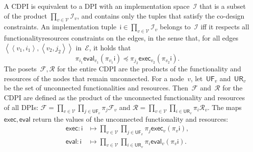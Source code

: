 \documentclass[twocolumn,english]{IEEEtran}
\theoremstyle{definition}
\theoremstyle{plain}
\theoremstyle{definition}
\theoremstyle{remark}
\theoremstyle{definition}
\theoremstyle{plain}
\theoremstyle{plain}
\newcommand{\aword}[1]{\mathsf{#1}}
\newcommand{\vmath}[1]{\aword{#1}}
\newcommand{\posleq}{\preceq}
\newcommand{\funsp}{\mathscr{F}}
\newcommand{\imp}{\vmath{i}}
\newcommand{\impsp}{\mathscr{I}}
\newcommand{\exc}{\vmath{exec}}
\newcommand{\eval}{\vmath{eval}}
\newcommand{\ressp}{\mathscr{R}}
\newcommand{\unconnectedfun}{\mathsf{UF}}
\newcommand{\unconnectedres}{\mathsf{UR}}
\newcommand{\cdpiN}{\mathcal{V}}
\newcommand{\cdpin}{v}
\newcommand{\cdpinA}{v_1}
\newcommand{\cdpinB}{v_2}
\newcommand{\cdpiresind}{i}
\newcommand{\cdpifunind}{j}
\newcommand{\cdpiresindA}{i_1}
\newcommand{\cdpifunindB}{j_2}
\begin{document}
A CDPI is equivalent to a DPI with an implementation space~$\impsp$
that is a subset of the product $\prod_{\cdpin\in\cdpiN}\impsp_{\cdpin}$,
and contains only the tuples that satisfy the co-design constraints.
An implementation tuple~$\imp\in\prod_{\cdpin\in\cdpiN}\impsp_{\cdpin}$
belongs to~$\impsp$ iff it respects all functionality\textendash resources
constraints on the edges, in the sense that, for all edges~$\left\langle \left\langle \cdpinA,\cdpiresindA\right\rangle ,\left\langle \cdpinB,\cdpifunindB\right\rangle \right\rangle $
in~$\mathcal{E}$, it holds that 
\[
\pi_{\cdpiresindA}\eval_{\cdpinA}(\pi_{\cdpinA}\imp)\posleq\pi_{\cdpifunindB}\exc_{\cdpinB}(\pi_{\cdpinB}\imp).
\]
The posets~$\funsp,\ressp$ for the entire CDPI are the products
of the functionality and resources of the nodes that remain unconnected.
For a node~$\cdpin$, let~$\unconnectedfun_{\cdpin}$ and~$\unconnectedres_{\cdpin}$
be the set of unconnected functionalities and resources. Then~$\funsp$
and~$\ressp$ for the CDPI are defined as the product of the unconnected
functionality and resources of all DPIs: $\funsp=\prod_{\cdpin\in\cdpiN}\prod_{\cdpifunind\in\unconnectedfun_{\cdpin}}\pi_{\cdpifunind}\funsp_{\cdpin}$
and $\ressp=\prod_{\cdpin\in\cdpiN}\prod_{\cdpiresind\in\unconnectedres_{\cdpin}}\pi_{\cdpiresind}\ressp_{\cdpin}.$
The maps $\exc,\eval$ return the values of the unconnected functionality
and resources:
\begin{align*}
\exc:\imp & \mapsto{\scriptstyle {\displaystyle \prod_{\cdpin\in\cdpiN}\prod_{\cdpifunind\in\unconnectedfun_{\cdpin}}}}\pi_{\cdpifunind}\exc_{\cdpin}(\pi_{\cdpin}\imp),\\
\eval:\imp & \mapsto{\displaystyle \prod_{\cdpin\in\cdpiN}\prod_{\cdpiresind\in\unconnectedres_{\cdpin}}}\pi_{\cdpiresind}\eval_{\cdpin}(\pi_{\cdpin}\imp).
\end{align*}
\end{document}
